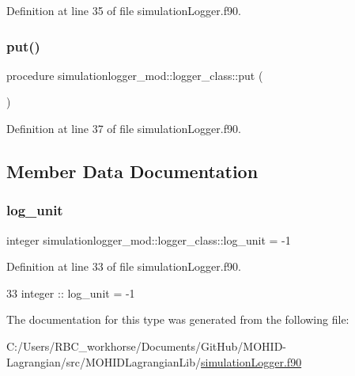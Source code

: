 Definition at line 35 of file simulation\+Logger.\+f90.

\mbox{\label{structsimulationlogger__mod_1_1logger__class_abe32488ffbf501397d43d1a61826cda6}} 
\subsubsection{\texorpdfstring{put()}{put()}}
{\footnotesize\ttfamily procedure simulationlogger\+\_\+mod\+::logger\+\_\+class\+::put (\begin{DoxyParamCaption}{ }\end{DoxyParamCaption})\hspace{0.3cm}{\ttfamily [private]}}



Definition at line 37 of file simulation\+Logger.\+f90.



\subsection{Member Data Documentation}
\mbox{\label{structsimulationlogger__mod_1_1logger__class_a3eb0b4ee7724fc420af081967ce767bd}} 
\subsubsection{\texorpdfstring{log\+\_\+unit}{log\_unit}}
{\footnotesize\ttfamily integer simulationlogger\+\_\+mod\+::logger\+\_\+class\+::log\+\_\+unit = -\/1\hspace{0.3cm}{\ttfamily [private]}}



Definition at line 33 of file simulation\+Logger.\+f90.


\begin{DoxyCode}
33         \textcolor{keywordtype}{integer} :: log\_unit = -1
\end{DoxyCode}


The documentation for this type was generated from the following file\+:\begin{DoxyCompactItemize}
\item 
C\+:/\+Users/\+R\+B\+C\+\_\+workhorse/\+Documents/\+Git\+Hub/\+M\+O\+H\+I\+D-\/\+Lagrangian/src/\+M\+O\+H\+I\+D\+Lagrangian\+Lib/\mbox{\hyperlink{simulation_logger_8f90}{simulation\+Logger.\+f90}}\end{DoxyCompactItemize}
